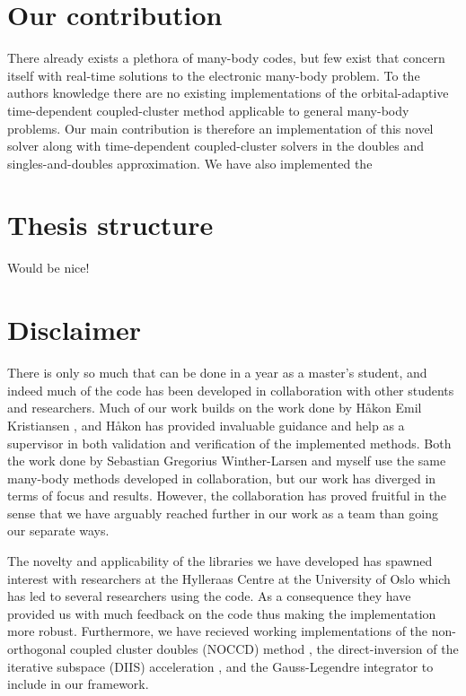     \section{Our contribution}
        There already exists a plethora of many-body codes, but few exist that
        concern itself with real-time solutions to the electronic many-body
        problem.
        To the authors knowledge there are no existing implementations of the
        orbital-adaptive time-dependent coupled-cluster method applicable to
        general many-body problems.
        Our main contribution is therefore an implementation of this novel
        solver along with time-dependent coupled-cluster solvers in the doubles
        and singles-and-doubles approximation.
        We have also implemented the

    \section{Thesis structure}
        Would be nice!

    \section{Disclaimer}
        There is only so much that can be done in a year as a master's student,
        and indeed much of the code has been developed in collaboration with
        other students and researchers.
        Much of our work builds on the work done by Håkon Emil Kristiansen
        \cite{kristiansen2017time}, and Håkon has provided invaluable guidance
        and help as a supervisor in both validation and verification of the
        implemented methods.
        Both the work done by Sebastian Gregorius Winther-Larsen
        \cite{greg-winther} and myself use the same many-body methods developed
        in collaboration, but our work has diverged in terms of focus and
        results.
        However, the collaboration has proved fruitful in the sense that we have
        arguably reached further in our work as a team than going our separate
        ways.

        The novelty and applicability of the libraries we have developed has
        spawned interest with researchers at the Hylleraas Centre at the
        University of Oslo which has led to several researchers using the code.
        As a consequence they have provided us with much feedback on the code
        thus making the implementation more robust.
        Furthermore, we have recieved working implementations of the
        non-orthogonal coupled cluster doubles (NOCCD) method \cite{rolf-nocc},
        the direct-inversion of the iterative subspace (DIIS) acceleration
        \cite{rolf-nocc}, and the Gauss-Legendre \cite{pedersen2018symplectic}
        integrator to include in our framework.
